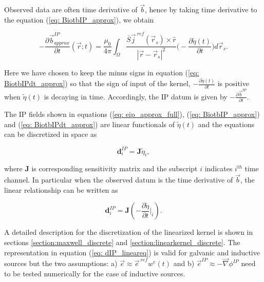 \documentclass[extra,mreferee]{gji}
\newcommand{\grad}{\vec \nabla}
\renewcommand {\j}  { {\vec j} }
\renewcommand {\b}  { {\vec b} }
\newcommand {\e}  { {\vec e} }
\newcommand{\peta}{\tilde{\eta}}
\newcommand{\eref}{\e^{\ ref}}
\newcommand{\jref}{\j^{\ ref}}
\begin{document}
Observed data are often time derivative of $\b$, hence by taking time derivative to the equation (\ref{eq: BiotbIP_approx}), we obtain
\begin{linenomath*}
\begin{equation}
  -\frac{\partial\b^{IP}_{approx}}{\partial t}(\vec{r}; t) = \frac{\mu_0}{4\pi} \int_{\Omega}  \frac{\bar{S}\jref(\vec{r}_s)\times\hat{r}}{|\vec{r}-\vec{r}_s|^2} \Big( -\frac{\partial \peta(t)}{\partial t} \Big) d\vec{r}_s.
  \label{eq: BiotbIPdt_approx}
\end{equation}
\end{linenomath*}
Here we have chosen to keep the minus signs in equation (\ref{eq: BiotbIPdt_approx}) so that the sign of input of the kernel, $-\frac{\partial \peta(t)}{\partial t}$ is positive when $\peta(t)$ is decaying in time. 
Accordingly, the IP datum is given by  $-\frac{\partial\b^{IP}}{\partial t}$. 

The IP fields shown in equations (\ref{eq: eip_approx_full}), (\ref{eq: BiotbIP_approx}) and (\ref{eq: BiotbIPdt_approx}) are linear functionals of $\peta(t)$ and  the equations can be discretized in space as
\begin{linenomath*}
\begin{equation}
  \mathbf{d}^{IP}_i = \mathbf{J}\peta_i,
  \label{eq: dIP_lineareq}
\end{equation}
\end{linenomath*}
where $\mathbf{J}$ is corresponding sensitivity matrix and the subscript $i$ indicates $i^{th}$ time channel. 
In particular when the observed datum is the time derivative of $\b$, the linear relationship can be written as 
\begin{linenomath*}
\begin{equation}
  \mathbf{d}^{IP}_i = \mathbf{J}(-\frac{\partial \peta}{\partial t}\Big|_i).
  \label{eq: dIP_lineareq_dbdt}
\end{equation}
\end{linenomath*}
A detailed description for the discretization of the linearized kernel is shown in sections \ref{section:maxwell_discrete} and \ref{section:linearkernel_discrete}. 
The representation in equation (\ref{eq: dIP_lineareq}) is valid for galvanic and inductive sources but the two assumptions: a) $\e \approx \eref w^e(t)$ and b) $\e^{IP} \approx -\grad\phi^{IP}$ need to be tested numerically for the case of inductive sources. 

\end{document}
